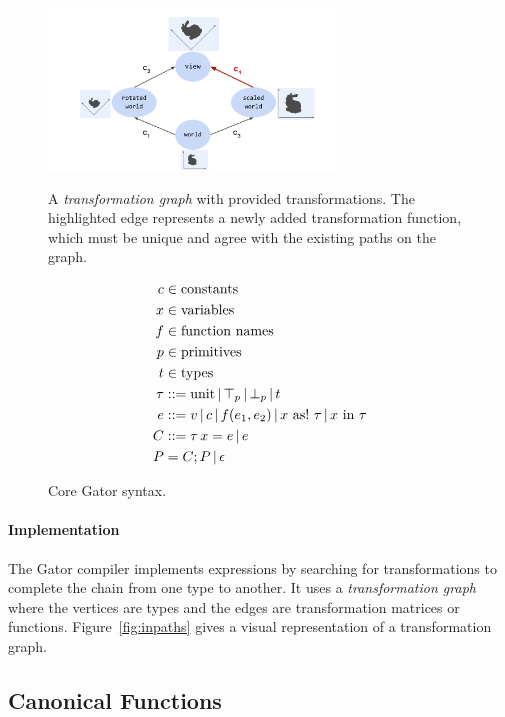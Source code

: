 \documentclass[../main.tex]{subfiles}
\begin{document}
\begin{figure}
	\begin{minipage}{.48\linewidth}
		\includegraphics[width=3in]{fig/canonical.pdf}
		\caption{A \emph{transformation graph} with provided transformations. The highlighted edge represents a newly added transformation function, which must be unique and agree with the existing paths on the graph.}
		\label{fig:inpaths}
	\end{minipage}
	\begin{minipage}{.48\linewidth}
		\begin{align*}
			c &\in\text{constants}\\
			x &\in\text{variables}\\
			f &\in \text{function names}\\
			p &\in\text{primitives}\\
			t &\in\text{types} \\
			\tau &\defas \textrm{unit} \,|\, \top_p \,|\, \bot_p \,|\, t \\
			e &\defas v \,|\, c \,|\, f(e_1, e_2) \,|\, x\ \textrm{as!}\ \tau \,|\, x\ \textrm{in}\ \tau\\
			C &\defas \tau \, x = e \,|\, e\\
			P  &=  C;P \,|\, \epsilon\\
		\end{align*}
		\caption{Core Gator syntax.}
		\label{fig:syntax}
	\end{minipage}
\end{figure}
\paragraph{Implementation}
The Gator compiler implements  expressions by searching for transformations to complete the chain from one type to another.
It uses a \emph{transformation graph} where the vertices are types and the edges are transformation matrices or functions.
Figure~\ref{fig:inpaths} gives a visual representation of a transformation graph.

\subsection{Canonical Functions}
\label{sec:canon}
\end{document}

